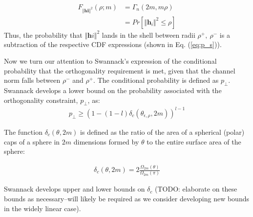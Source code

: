\begin{equation}\label{eq:ch_sq_cdf_chan}
    \begin{aligned}
        F_{\Vert\textbf{hi}\Vert^2}(\rho;m)& = \Gamma_n(2m,m\rho)\\
        &= Pr[\Vert\textbf{h}_i\Vert^2 \leq \rho]
    \end{aligned}
\end{equation}
 Thus, the probability that $\Vert\textbf{h}i\Vert^2$ lands in the shell between radii $\rho^+,\ \rho^-$ is a subtraction of the respective CDF expressions (shown in Eq. (\ref{eq:p_s})).

Now we turn our attention to Swannack's expression of the conditional probability that the orthogonality requirement is met, given that the channel norm falls between $\rho^-$ and $\rho^+$. The conditional probability is defined as $p_\perp$. Swannack develops a lower bound on the probability associated with the orthogonality constraint, $p_\perp$, as:
\begin{equation}\label{eq:p_perp}
    \begin{aligned}
        p_\perp \geq (1-(1-l)\delta_c(\theta_{\epsilon,\rho},2m))^{l-1}
    \end{aligned}
\end{equation}

The function $\delta_c(\theta,2m)$ is defined as the ratio of the area of a spherical (polar) caps of a sphere in $2m$ dimensions formed by $\theta$ to the entire surface area of the sphere:

\begin{equation}\label{eq:delta_c_sphere}
    \begin{aligned}
        \delta_c(\theta,2m) = 2\frac{\Omega_{2m}(\theta)}{\Omega_{2m}(\pi)}
    \end{aligned}
\end{equation}

Swannack develops upper and lower bounds on $\delta_c$ (TODO: elaborate on these bounds as necessary--will likely be required as we consider developing new bounds in the widely linear case).

